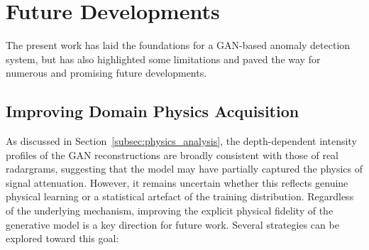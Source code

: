 \section{Future Developments}
\label{cha:future_work}

The present work has laid the foundations for a GAN-based anomaly detection system, but has also highlighted some limitations and paved the way for numerous and promising future developments.

\subsection{Improving Domain Physics Acquisition}

As discussed in Section~\ref{subsec:physics_analysis}, the depth-dependent intensity profiles of the GAN reconstructions are broadly consistent with those of real radargrams, suggesting that the model may have partially captured the physics of signal attenuation.
However, it remains uncertain whether this reflects genuine physical learning or a statistical artefact of the training distribution.
Regardless of the underlying mechanism, improving the explicit physical fidelity of the generative model is a key direction for future work.
Several strategies can be explored toward this goal:

